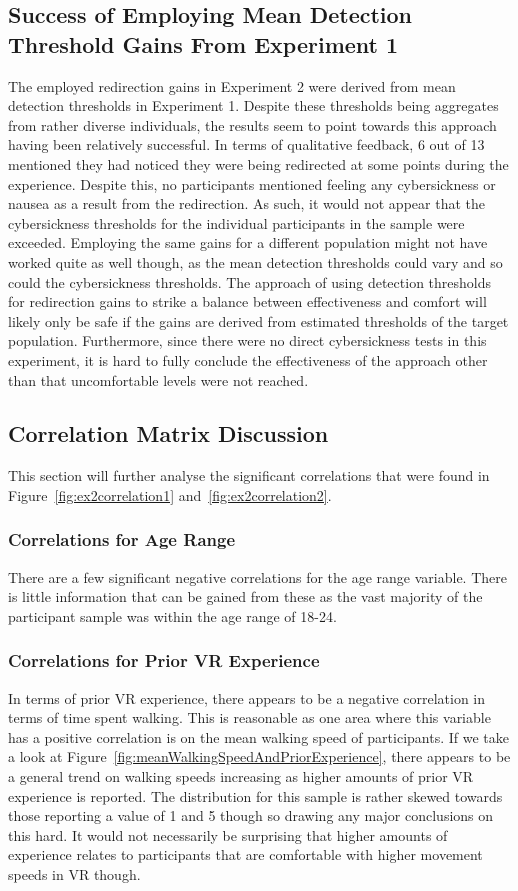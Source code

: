 \subsection{Success of Employing Mean Detection Threshold Gains From Experiment 1}
The employed redirection gains in Experiment 2 were derived from mean detection thresholds in Experiment 1. Despite these thresholds being aggregates from rather diverse individuals, the results seem to point towards this approach having been relatively successful. In terms of qualitative feedback, 6 out of 13 mentioned they had noticed they were being redirected at some points during the experience. Despite this, no participants mentioned feeling any cybersickness or nausea as a result from the redirection. As such, it would not appear that the cybersickness thresholds for the individual participants in the sample were exceeded. Employing the same gains for a different population might not have worked quite as well though, as the mean detection thresholds could vary and so could the cybersickness thresholds. The approach of using detection thresholds for redirection gains to strike a balance between effectiveness and comfort will likely only be safe if the gains are derived from estimated thresholds of the target population. Furthermore, since there were no direct cybersickness tests in this experiment, it is hard to fully conclude the effectiveness of the approach other than that uncomfortable levels were not reached.  

\subsection{Correlation Matrix Discussion}\label{sec:ex2correlationAnalysis}
This section will further analyse the significant correlations that were found in Figure~\ref{fig:ex2correlation1} and~\ref{fig:ex2correlation2}. 

\subsubsection{Correlations for Age Range}
There are a few significant negative correlations for the age range variable. There is little information that can be gained from these as the vast majority of the participant sample was within the age range of 18-24. 

\subsubsection{Correlations for Prior VR Experience}
In terms of prior VR experience, there appears to be a negative correlation in terms of time spent walking. This is reasonable as one area where this variable has a positive correlation is on the mean walking speed of participants. If we take a look at Figure~\ref{fig:meanWalkingSpeedAndPriorExperience}, there appears to be a general trend on walking speeds increasing as higher amounts of prior VR experience is reported. The distribution for this sample is rather skewed towards those reporting a value of 1 and 5 though so drawing any major conclusions on this hard. It would not necessarily be surprising that higher amounts of experience relates to participants that are comfortable with higher movement speeds in VR though.

